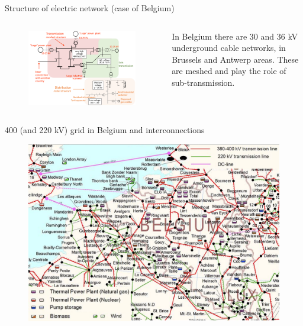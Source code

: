 \begin{frame}{Structure of electric network (case of Belgium)}

\begin{columns}
    \begin{column}{0.6\textwidth}
      \begin{figure}
      \centering
      \includegraphics[width=\linewidth]{images/network_structure.png}
      \end{figure}
    \end{column}
    \begin{column}{0.35\textwidth}
      \footnotesize{In Belgium there are 30 and 36 kV underground cable networks, in Brussels and Antwerp areas. These are meshed and play the role of sub-transmission.}
    \end{column}
\end{columns}


\end{frame}

\begin{frame}{400 (and 220 kV) grid in Belgium and interconnections}
\begin{figure}
\centering
\includegraphics[width=0.6\linewidth]{images/intro_elia.png}
\end{figure}
\end{frame}

